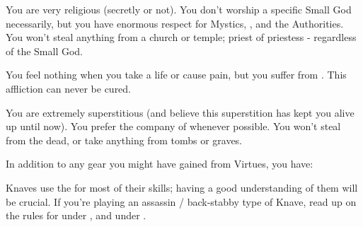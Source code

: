 \begin{multicols*}{2}

    You are very religious (secretly or not). You don't worship a specific Small God necessarily, but you have enormous respect for Mystics, \TheAuthority, and the Authorities. You won't steal anything from a church or temple; priest of priestess - regardless of the Small God.

\cbreak


    You feel nothing when you take a life or cause pain, but you suffer from . This affliction can never be cured.



    You are extremely superstitious (and believe this superstition has kept you alive up until now). You prefer the company of  whenever possible. You won't steal from the dead, or take anything from tombs or graves.



    In addition to any gear you might have gained from Virtues, you have:


  

    Knaves use the  for most of their skills; having a good understanding of them will be crucial. If you're playing an assassin / back-stabby type of Knave, read up on the rules for  under , and  under .

\end{multicols*}

